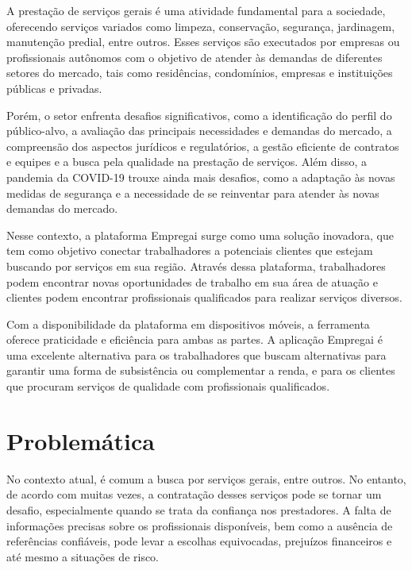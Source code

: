 A prestação de serviços gerais é uma atividade fundamental para a sociedade, oferecendo serviços variados como limpeza, conservação, segurança, jardinagem, manutenção predial, entre outros. Esses serviços são executados por empresas ou profissionais autônomos com o objetivo de atender às demandas de diferentes setores do mercado, tais como residências, condomínios, empresas e instituições públicas e privadas.

Porém, o setor enfrenta desafios significativos, como a identificação do perfil do público-alvo, a avaliação das principais necessidades e demandas do mercado, a compreensão dos aspectos jurídicos e regulatórios, a gestão eficiente de contratos e equipes e a busca pela qualidade na prestação de serviços. Além disso, a pandemia da COVID-19 trouxe ainda mais desafios, como a adaptação às novas medidas de segurança e a necessidade de se reinventar para atender às novas demandas do mercado.

Nesse contexto, a plataforma Empregai surge como uma solução inovadora, que tem como objetivo conectar trabalhadores a potenciais clientes que estejam buscando por serviços em sua região. Através dessa plataforma, trabalhadores podem encontrar novas oportunidades de trabalho em sua área de atuação e clientes podem encontrar profissionais qualificados para realizar serviços diversos.

Com a disponibilidade da plataforma em dispositivos móveis, a ferramenta oferece praticidade e eficiência para ambas as partes. A aplicação Empregai é uma excelente alternativa para os trabalhadores que buscam alternativas para garantir uma forma de subsistência ou complementar a renda, e para os clientes que procuram serviços de qualidade com profissionais qualificados.

\section{Problemática}

No contexto atual, é comum a busca por serviços gerais, entre outros. No entanto, de acordo com \textcite{FEUP2009} muitas vezes, a contratação desses serviços pode se tornar um desafio, especialmente quando se trata da confiança nos prestadores. A falta de informações precisas sobre os profissionais disponíveis, bem como a ausência de referências confiáveis, pode levar a escolhas equivocadas, prejuízos financeiros e até mesmo a situações de risco.

